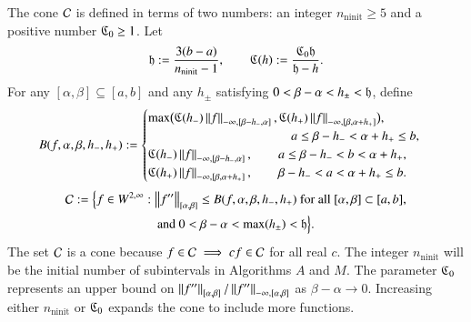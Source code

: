 \documentclass[review]{elsarticle}
\makeatletter
\newcommand{\Vast}{\bBigg@{6}}
\theoremstyle{definition}
\newcommand{\Vastr}{\mathclose\Vast}
\renewcommand{\cw}{W}
\DeclareMathOperator{\ninit}{ninit}
\makeatother
\begin{document}
The cone $\cc$ is defined in terms of two numbers:  an integer $n_{\ninit} \ge 5$ and a positive number  $\fC_0 \ge 1$.  Let 
\begin{equation}
\label{hCdef}
\fh := \frac{3(b-a)}{n_{\ninit}-1}, \qquad \fC(h) : = \frac{\fC_0 \fh}{\fh - h}.
\end{equation}
For any $[\alpha, \beta] \subseteq [a,b]$ and any $h_{\pm}$ satisfying $0 < \beta - \alpha < h_{\pm} < \fh$, define
\begin{equation} \label{tbdef}
B(f,\alpha,\beta,h_-,h_+) :=
\begin{cases}
\max\bigl(\fC(h_{-}) \norm[-\infty,{[\beta-h_-,\alpha]}]{f},\fC(h_{+}) \norm[-\infty,{[\beta, \alpha+h_+]}]{f}\bigr), \\
\hspace{25ex} a \le \beta- h_- <  \alpha + h_+ \le b,\\
\fC(h_{-}) \norm[-\infty,{[\beta-h_-,\alpha]}]{f}, \qquad a \le \beta- h_-  < b< \alpha + h_+ ,\\
\fC(h_{+}) \norm[-\infty,{[\beta, \alpha+h_+]}]{f}, \qquad \beta- h_- <  a < \alpha + h_+ \le b.
\end{cases} %
\end{equation}
\begin{multline} \label{conedef}
 \cc :=   \Bigl \{
 f  \in    \cw^{2,\infty}:   \norm[{[\alpha,\beta]}]{f''}  \le B(f,\alpha,\beta,h_-,h_+)  \text{ for all } [\alpha,\beta] \subset [a,b],
\\ \text{and } 0 < \beta - \alpha < \max(h_{\pm}) < \fh  \Bigr \}.
\end{multline}
The set $\cc$ is a cone because $f \in \cc \implies cf \in \cc$ for all real $c$. The integer $n_{\ninit}$ will be the initial number of subintervals in  Algorithms $A$ and $M$.  The parameter $\fC_0$ represents an upper bound on $\norm[{[\alpha,\beta]}]{f''}/\norm[-\infty,{[\alpha,\beta]}]{f''}$ as $\beta - \alpha \to 0$. Increasing either $n_{\ninit}$ or  $\fC_0$ expands the cone to include more functions.
\end{document}
